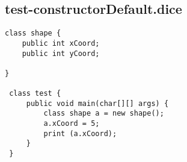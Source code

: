 \subsection{test-constructorDefault.dice}
\begin{verbatim}
class shape {
	public int xCoord;
	public int yCoord;
	
}

 class test {
	 public void main(char[][] args) {
		 class shape a = new shape();
		 a.xCoord = 5;
		 print (a.xCoord);
	 }
 }
\end{verbatim}